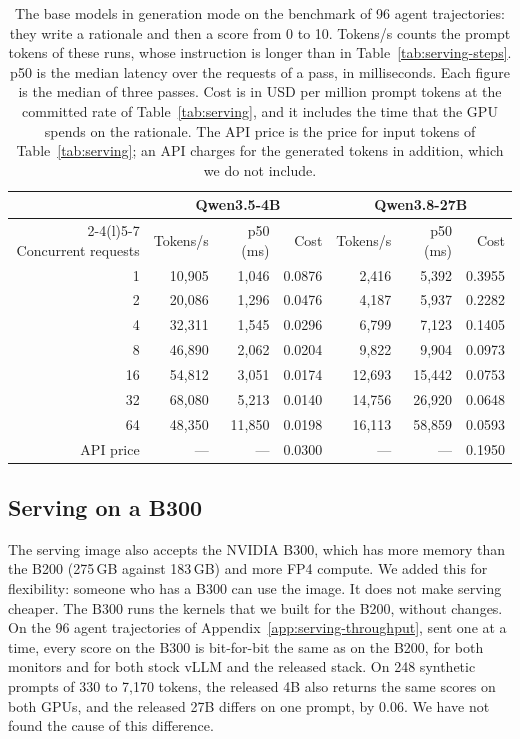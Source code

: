 \begin{table}[h]
\caption{The base models in generation mode on the benchmark of 96 agent trajectories: they write a rationale and then a score from 0 to 10. Tokens/s counts the prompt tokens of these runs, whose instruction is longer than in Table~\ref{tab:serving-steps}. p50 is the median latency over the requests of a pass, in milliseconds. Each figure is the median of three passes. Cost is in USD per million prompt tokens at the committed rate of Table~\ref{tab:serving}, and it includes the time that the GPU spends on the rationale. The API price is the price for input tokens of Table~\ref{tab:serving}; an API charges for the generated tokens in addition, which we do not include.}
\label{tab:serving-generation}
\centering
\small
\begin{tabular}{@{}rrrrrrr@{}}
\toprule
 & \multicolumn{3}{c}{Qwen3.5-4B} & \multicolumn{3}{c}{Qwen3.8-27B} \\
\cmidrule(lr){2-4}\cmidrule(l){5-7}
Concurrent requests & Tokens/s & p50 (ms) & Cost & Tokens/s & p50 (ms) & Cost \\
\midrule
1 & 10,905 & 1,046 & 0.0876 & 2,416 & 5,392 & 0.3955 \\
2 & 20,086 & 1,296 & 0.0476 & 4,187 & 5,937 & 0.2282 \\
4 & 32,311 & 1,545 & 0.0296 & 6,799 & 7,123 & 0.1405 \\
8 & 46,890 & 2,062 & 0.0204 & 9,822 & 9,904 & 0.0973 \\
16 & 54,812 & 3,051 & 0.0174 & 12,693 & 15,442 & 0.0753 \\
32 & 68,080 & 5,213 & 0.0140 & 14,756 & 26,920 & 0.0648 \\
64 & 48,350 & 11,850 & 0.0198 & 16,113 & 58,859 & 0.0593 \\
\midrule
API price & --- & --- & 0.0300 & --- & --- & 0.1950 \\
\bottomrule
\end{tabular}
\end{table}

\subsection{Serving on a B300}
\label{app:serving-b300}

The serving image also accepts the NVIDIA B300, which has more memory than the B200 (275\,GB against 183\,GB) and more FP4 compute.
We added this for flexibility: someone who has a B300 can use the image.
It does not make serving cheaper.
The B300 runs the kernels that we built for the B200, without changes.
On the 96 agent trajectories of Appendix~\ref{app:serving-throughput}, sent one at a time, every score on the B300 is bit-for-bit the same as on the B200, for both monitors and for both stock vLLM and the released stack.
On 248 synthetic prompts of 330 to 7,170 tokens, the released 4B also returns the same scores on both GPUs, and the released 27B differs on one prompt, by 0.06.
We have not found the cause of this difference.

